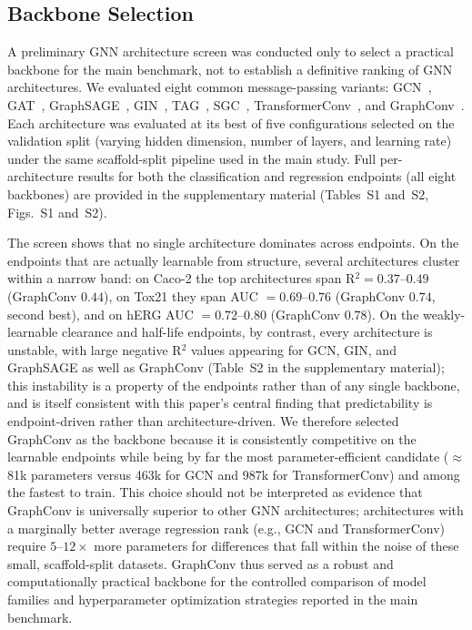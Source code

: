 \documentclass[journal]{IEEEtran}
\begin{document}
\subsection{Backbone Selection}
\label{sec:arch_selection}

A preliminary GNN architecture screen was conducted only to select a practical backbone for the main benchmark, not to establish a definitive ranking of GNN architectures. We evaluated eight common message-passing variants: GCN~\cite{kipf2017gcn}, GAT~\cite{velickovic2018gat}, GraphSAGE~\cite{hamilton2017graphsage}, GIN~\cite{xu2019gin}, TAG~\cite{du2018tagcn}, SGC~\cite{wu2019sgc}, TransformerConv~\cite{shi2021unimp}, and GraphConv~\cite{morris2019wlgnn}. Each architecture was evaluated at its best of five configurations selected on the validation split (varying hidden dimension, number of layers, and learning rate) under the same scaffold-split pipeline used in the main study. Full per-architecture results for both the classification and regression endpoints (all eight backbones) are provided in the supplementary material (Tables~S1 and~S2, Figs.~S1 and~S2).

The screen shows that no single architecture dominates across endpoints. On the endpoints that are actually learnable from structure, several architectures cluster within a narrow band: on Caco-2 the top architectures span R$^2 = 0.37$--$0.49$ (GraphConv $0.44$), on Tox21 they span AUC $= 0.69$--$0.76$ (GraphConv $0.74$, second best), and on hERG AUC $= 0.72$--$0.80$ (GraphConv $0.78$). On the weakly-learnable clearance and half-life endpoints, by contrast, every architecture is unstable, with large negative R$^2$ values appearing for GCN, GIN, and GraphSAGE as well as GraphConv (Table~S2 in the supplementary material); this instability is a property of the endpoints rather than of any single backbone, and is itself consistent with this paper's central finding that predictability is endpoint-driven rather than architecture-driven. We therefore selected GraphConv as the backbone because it is consistently competitive on the learnable endpoints while being by far the most parameter-efficient candidate ($\approx$81k parameters versus 463k for GCN and 987k for TransformerConv) and among the fastest to train. This choice should not be interpreted as evidence that GraphConv is universally superior to other GNN architectures; architectures with a marginally better average regression rank (e.g., GCN and TransformerConv) require $5$--$12\times$ more parameters for differences that fall within the noise of these small, scaffold-split datasets. GraphConv thus served as a robust and computationally practical backbone for the controlled comparison of model families and hyperparameter optimization strategies reported in the main benchmark.
\end{document}
